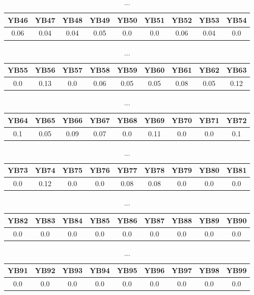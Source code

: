 \documentclass[]{article}
\begin{document}
\begin{table}[h]
	\centering
	\begin{tabular}{|c|c|c|c|c|c|c|c|c|}
		\hline
		YB46 & YB47 & YB48 & YB49 & YB50 & YB51 & YB52 & YB53 & YB54 \\
		\hline
		0.06 & 0.04 & 0.04 & 0.05 & 0.0  & 0.0  & 0.06 & 0.04 & 0.0  \\
		\hline
	\end{tabular}
	\caption{...}
\end{table}
\begin{table}[h]
	\centering
	\begin{tabular}{|c|c|c|c|c|c|c|c|c|}
		\hline
		YB55 & YB56 & YB57 & YB58 & YB59 & YB60 & YB61 & YB62 & YB63 \\
		\hline
		0.0  & 0.13 & 0.0  & 0.06 & 0.05 & 0.05 & 0.08 & 0.05 & 0.12 \\
		\hline
	\end{tabular}
	\caption{...}
\end{table}
\begin{table}[h]
	\centering
	\begin{tabular}{|c|c|c|c|c|c|c|c|c|}
		\hline
		YB64 & YB65 & YB66 & YB67 & YB68 & YB69 & YB70 & YB71 & YB72 \\
		\hline
		0.1  & 0.05 & 0.09 & 0.07 & 0.0  & 0.11 & 0.0  & 0.0  & 0.1  \\
		\hline
	\end{tabular}
	\caption{...}
\end{table}
\begin{table}[h]
	\centering
	\begin{tabular}{|c|c|c|c|c|c|c|c|c|}
		\hline
		YB73 & YB74 & YB75 & YB76 & YB77 & YB78 & YB79 & YB80 & YB81 \\
		\hline
		0.0  & 0.12 & 0.0  & 0.0  & 0.08 & 0.08 & 0.0  & 0.0  & 0.0  \\
		\hline
	\end{tabular}
	\caption{...}
\end{table}
\begin{table}[h]
	\centering
	\begin{tabular}{|c|c|c|c|c|c|c|c|c|}
		\hline
		YB82 & YB83 & YB84 & YB85 & YB86 & YB87 & YB88 & YB89 & YB90 \\
		\hline
		0.0  & 0.0  & 0.0  & 0.0  & 0.0  & 0.0  & 0.0  & 0.0  & 0.0  \\
		\hline
	\end{tabular}
	\caption{...}
\end{table}
\begin{table}[h]
	\centering
	\begin{tabular}{|c|c|c|c|c|c|c|c|c|}
		\hline
		YB91 & YB92 & YB93 & YB94 & YB95 & YB96 & YB97 & YB98 & YB99 \\
		\hline
		0.0  & 0.0  & 0.0  & 0.0  & 0.0  & 0.0  & 0.0  & 0.0  & 0.0  \\
		\hline
	\end{tabular}
	\caption{...}
\end{table}
\end{document}
